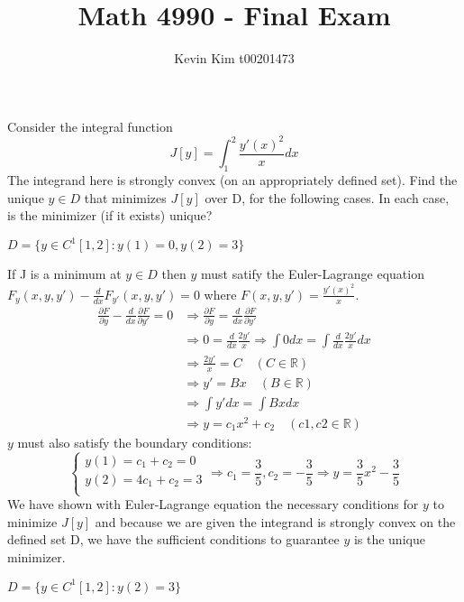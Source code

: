 \documentclass[12pt]{article}
\newcommand{\R}{\mathbb{R}}
\newcommand{\lra}{\Longrightarrow}
\newenvironment{problem}[2][Problem]{\begin{trivlist}
  \item[\hskip \labelsep {\bfseries #1}\hskip \labelsep {\bfseries #2:}]}{\end{trivlist}}
\newenvironment{subproblem}[2][Part]{\begin{trivlist}
  \item[\hskip \labelsep {\bfseries #1}\hskip \labelsep {\bfseries (#2)}]}{\end{trivlist}}
\newenvironment{solution}[1][Solution]{\begin{trivlist}
  \item[\hskip \labelsep {\bfseries #1} \hskip \labelsep]}{\end{trivlist}}
\theoremstyle{remark}
\begin{document}
 
\title{Math 4990 - Final Exam}
\author{Kevin Kim t00201473}
\maketitle
 
\begin{problem}{1} 
  Consider the integral function
  \[
    J[y] = \int_{1}^{2}\frac{y'(x)^2}{x}dx
  \]
  The integrand here is strongly convex (on an appropriately defined set).
  Find the unique \(y \in D\) that minimizes \(J[y]\) over D, for the following cases.
  In each case, is the minimizer (if it exists) unique?
\end{problem}

\begin{subproblem}{a}
  \(D=\{y \in C^1[1,2]:y(1) = 0, y(2) = 3\}\)
\end{subproblem}

\begin{solution}
  $ $\\
  If J is a minimum at \(y \in D \) then \(y\) must satify the Euler-Lagrange equation
  \\\(F_y(x,y,y') - \frac{d}{dx}F_{y'}(x,y,y') = 0\) where \(F(x,y,y') = \frac{y'(x)^2}{x}\).
  \begin{align*}
    \frac{\partial F}{\partial y} - \frac{d}{dx}\frac{\partial F}{\partial y'} = 0
    &\lra \frac{\partial F}{\partial y} = \frac{d}{dx}\frac{\partial F}{\partial y'} \\
    &\lra 0 = \frac{d}{dx}\frac{2y'}{x} \lra \int 0 dx = \int \frac{d}{dx}\frac{2y'}{x} dx \\
    &\lra \frac{2y'}{x} = C \quad (C \in \R) \\
    &\lra y' = Bx \quad (B \in \R) \\
    &\lra \int y' dx = \int Bx dx \\
    &\lra y = c_1x^2 + c_2 \quad (c1,c2 \in \R)
  \end{align*}
  \(y\) must also satisfy the boundary conditions:
  \[
    \left\{
      \begin{array}{ll}
        y(1) = c_1 + c_2 = 0\\
        y(2) = 4c_1 + c_2 = 3\\
      \end{array}
    \right.
    \lra c_1 = \frac{3}{5}, c_2 = -\frac{3}{5} \lra \boxed{y = \frac{3}{5}x^2 - \frac{3}{5}}
  \]
  We have shown with Euler-Lagrange equation the necessary conditions for \(y\) to minimize \(J[y]\)
  and because we are given the integrand is strongly convex on the defined set D, we have
  the sufficient conditions to guarantee \(y\) is the unique minimizer.
\end{solution}
\clearpage
\begin{subproblem}{b}
  \(D = \{y \in C^1[1,2]:y(2) = 3\}\)
\end{subproblem}
\end{document}
